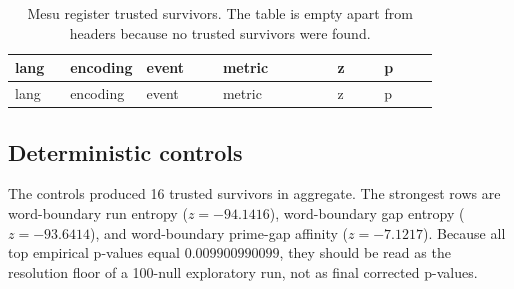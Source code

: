 \documentclass[11pt,a4paper]{article}
\begin{document}
\begingroup
\scriptsize
\setlength{\tabcolsep}{3pt}
\renewcommand{\arraystretch}{1.12}
\begin{longtable}{p{0.13\linewidth}p{0.18\linewidth}p{0.18\linewidth}p{0.27\linewidth}p{0.11\linewidth}p{0.13\linewidth}}
\caption{Mesu register trusted survivors. The table is empty apart from headers because no trusted survivors were found.}\label{tab:mesu-register}\\
\toprule
lang & encoding & event & metric & z & p \\
\midrule
\endfirsthead
\toprule
lang & encoding & event & metric & z & p \\
\midrule
\endhead
\bottomrule
\end{longtable}
\endgroup

\subsection{Deterministic controls}
The controls produced 16 trusted survivors in aggregate. The strongest rows are word-boundary run entropy ($z=-94.1416$), word-boundary gap entropy ($z=-93.6414$), and word-boundary prime-gap affinity ($z=-7.1217$). Because all top empirical p-values equal $0.009900990099$, they should be read as the resolution floor of a 100-null exploratory run, not as final corrected p-values.
\end{document}
